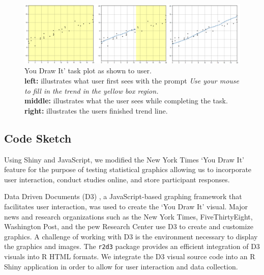 \documentclass[10pt]{article}
\begin{document}
\begin{figure}[ht]
\begin{center}
\centerline{\includegraphics[width=\columnwidth]{images/ydi-stimuli}}
\caption{You Draw It' task plot as shown to user. \\
\textbf{left:} illustrates what user first sees with the prompt \textit{Use your mouse to fill in the trend in the yellow box region.} \\
\textbf{middle:} illustrates what the user sees while completing the task.\\
\textbf{right:} illustrates the users finished trend line.}
\label{you-draw-it-task-plot}
\end{center}
\end{figure}

\subsection{Code Sketch}

Using Shiny \cite{shinypkg} and JavaScript, we modified the New York
Times `You Draw It' feature for the purpose of testing statistical
graphics allowing us to incorporate user interaction, conduct studies
online, and store participant responses.

Data Driven Documents (D3) \cite{bostock2011d3}, a JavaScript-based
graphing framework that facilitates user interaction, was used to create
the `You Draw It' visual. Major news and research organizations such as
the New York Times, FiveThirtyEight, Washington Post, and the pew
Research Center use D3 to create and customize graphics. A challenge of
working with D3 is the environment necessary to display the graphics and
images. The \texttt{r2d3} package \cite{r2d3pkg} provides an efficient
integration of D3 visuals into R HTML formats. We integrate the D3
visual source code into an R Shiny \cite{shinypkg} application in order
to allow for user interaction and data collection.
\end{document}
